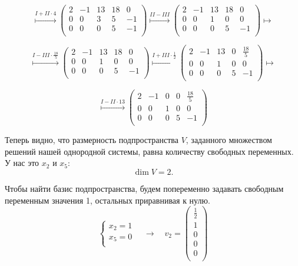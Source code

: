 \documentclass[a4paper,12pt]{article}
\begin{document}
$$
\overset{I + II \cdot 4}{\longmapsto}
\begin{pmatrix}
2&-1&13&18&0\\
0&0&3&5&-1\\
0&0&0&5&-1\\
\end{pmatrix}
\overset{II-III}{\longmapsto}
\begin{pmatrix}
2&-1&13&18&0\\
0&0&1&0&0\\
0&0&0&5&-1\\
\end{pmatrix}
\longmapsto
$$

$$
\overset{I - III \cdot \frac{18}{5}}{\longmapsto}
\begin{pmatrix}
2&-1&13&18&0\\
0&0&1&0&0\\
0&0&0&5&-1\\
\end{pmatrix}
\overset{I+ III \cdot \frac{1}{2}}{\longmapsto}
\begin{pmatrix}
2&-1&13&0&\frac{18}{5}\\
0&0&1&0&0\\
0&0&0&5&-1\\
\end{pmatrix}
\longmapsto
$$

$$
\overset{I - II \cdot 13}{\longmapsto}
\begin{pmatrix}
2&-1&0&0&\frac{18}{5}\\
0&0&1&0&0\\
0&0&0&5&-1\\
\end{pmatrix}
$$

\par
Теперь видно, что размерность подпространства $V$, заданного множеством решений нашей однородной системы, равна количеству свободных переменных. У нас это $x_2$ и $x_5$:
$$\dim V = 2.$$ \par
Чтобы найти базис подпространства, будем попеременно задавать свободным переменным значения 1, остальных приравнивая к нулю.
$$
\left\{
\begin{aligned}
x_2=1 \\
x_5 = 0 \\
\end{aligned} 
\right.
\quad \longrightarrow \quad
v_2 = 
\begin{pmatrix}
\frac{1}{2} \\
1 \\
0 \\
0 \\
0 \\
\end{pmatrix}
$$
\end{document}
